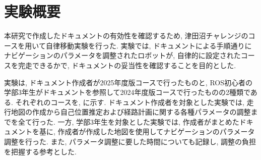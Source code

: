 \section{実験概要}
本研究で作成したドキュメントの有効性を確認するため, 津田沼チャレンジ\cite{tsudachare}のコースを用いて自律移動実験を行った. 
実験では, ドキュメントによる手順通りにナビゲーションのパラメータを調整されたロボットが, 自律的に設定されたコースを完走できるかで, ドキュメントの妥当性を確認することを目的とした. 

実験は, ドキュメント作成者が2025年度版コースで行ったものと, ROS初心者の学部3年生がドキュメントを参照して2024年度版コースで行ったものの2種類である. 
それぞれのコースを, に示す.
ドキュメント作成者を対象とした実験では, 走行地図の作成から自己位置推定および経路計画に関する各種パラメータの調整までを全て行った. 
一方, 学部3年生を対象とした実験では, 作成者がまとめたドキュメントを基に, 作成者が作成した地図を使用してナビゲーションのパラメータ調整を行った. 
また, パラメータ調整に要した時間についても記録し, 調整の負担を把握する参考とした. 

